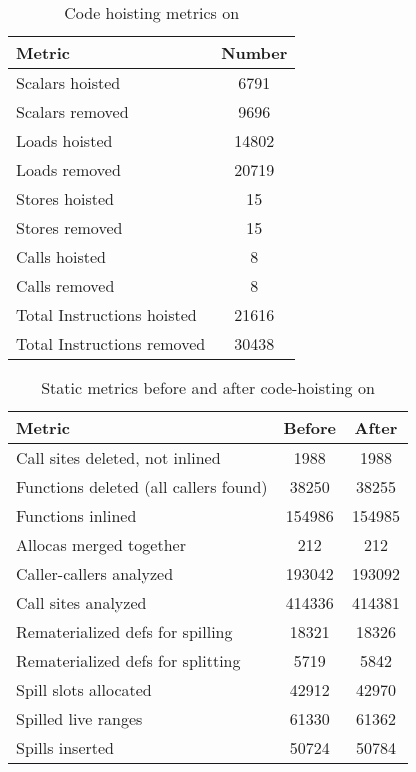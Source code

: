 \documentclass{sig-alternate}
\begin{document}
\begin{table}[h!]
  \begin{center}
    \begin{tabular}{|l|c|}
      \hline
      Metric               & Number\\\hline
      Scalars hoisted      & 6791  \\\hline
      Scalars removed      & 9696  \\\hline
      Loads hoisted        & 14802 \\\hline
      Loads removed        & 20719 \\\hline
      Stores hoisted       & 15    \\\hline
      Stores removed       & 15    \\\hline
      Calls hoisted        & 8     \\\hline
      Calls removed        & 8     \\\hline
      Total Instructions hoisted & 21616 \\\hline
      Total Instructions removed & 30438 \\\hline
\end{tabular}
  \end{center}
  \caption{Code hoisting metrics on \LLVMTestSuite{}}
  \label{tab:hoist-results}
\end{table}

\begin{table}[h!]
  \begin{center}
    \begin{tabular}{|l|c|c|}
      \hline
      Metric               & Before & After              \\\hline
      Call sites deleted, not inlined             & 1988    & 1988   \\\hline
      Functions deleted (all callers found)       & 38250   & 38255  \\\hline
      Functions inlined                           & 154986  & 154985 \\\hline
      Allocas merged together                     & 212     & 212    \\\hline
      Caller-callers analyzed                     & 193042  & 193092 \\\hline
      Call sites analyzed                         & 414336  & 414381 \\\hline
      Rematerialized defs for spilling            & 18321   & 18326  \\\hline
      Rematerialized defs for splitting           & 5719    & 5842   \\\hline
      Spill slots allocated                       & 42912   & 42970  \\\hline
      Spilled live ranges                         & 61330   & 61362  \\\hline
      Spills inserted                             & 50724   & 50784  \\\hline
\end{tabular}
  \end{center}
  \caption{Static metrics before and after code-hoisting on \LLVMTestSuite{}}
  \label{tab:static-results}
\end{table}
\end{document}
